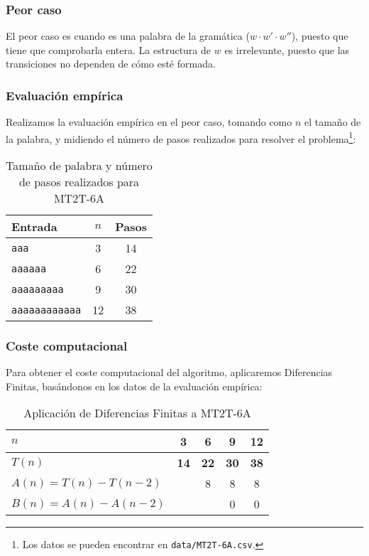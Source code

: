

\subsubsection*{Peor caso}
El peor caso es cuando es una palabra de la gramática ($w \cdot w' \cdot w''$), puesto que tiene que comprobarla entera. La estructura de $w$ es irrelevante, puesto que las transiciones no dependen de cómo esté formada.


\subsubsection*{Evaluación empírica}
Realizamos la evaluación empírica en el peor caso, tomando como $n$ el tamaño de la palabra, y midiendo el número de pasos realizados para resolver el problema\footnote{Los datos se pueden encontrar en \texttt{data/MT2T-6A.csv}.}:

\begin{table}[h]
    \centering
    \begin{tabular}{lcc}
        Entrada & $n$ & Pasos \\
        \hline
        \texttt{aaa}                &  3  & 14 \\
        \texttt{aaaaaa}             &  6  & 22 \\
        \texttt{aaaaaaaaa}          &  9  & 30 \\
        \texttt{aaaaaaaaaaaa}       & 12  & 38 \\
    \end{tabular}
    \caption{Tamaño de palabra y número de pasos realizados para MT2T-6A}
\end{table}


\subsubsection*{Coste computacional}
Para obtener el coste computacional del algoritmo, aplicaremos Diferencias Finitas, basándonos en los datos de la evaluación empírica:

\begin{table}[H]
    \centering
    \begin{tabular}{|l|c|c|c|c|}
        \hline
        $n$    & \textbf{3}  & \textbf{6}  & \textbf{9}  & \textbf{12} \\ \hline
        $T(n)$ & \textbf{14} & \textbf{22} & \textbf{30} & \textbf{38} \\ \hline
        \hline
        $A(n) = T(n) - T(n-2)$ &   & 8 & 8 & 8 \\ \hline
        $B(n) = A(n) - A(n-2)$ &   &   & 0 & 0 \\ \hline
    \end{tabular}
    \caption{Aplicación de Diferencias Finitas a MT2T-6A}
\end{table}

